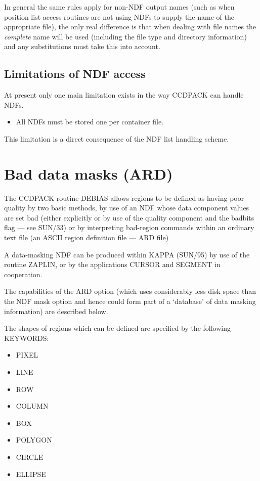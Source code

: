 In general the same rules apply for non-NDF output names (such as when
position list access routines are not using NDFs to supply the name of
the appropriate file), the only real difference is that when dealing
with file names the {\em complete} name will be used (including the file
type and directory information) and any substitutions must take this
into account.

\subsection{Limitations of NDF access}
At present only one main limitation exists in the way CCDPACK can handle
NDFs.

\begin{itemize}
\item All NDFs must be stored one per container file.
\end{itemize}

This limitation is a direct consequence of the NDF list handling scheme.

\section{Bad data masks (ARD)}
\label{datamasks}
The CCDPACK routine DEBIAS allows regions to be defined as having poor
quality by two basic methods, by use of an NDF whose data component
values are set bad (either explicitly or by use of the quality component
and the badbits flag --- see SUN/33) or by interpreting bad-region
commands within an ordinary text file (an ASCII region definition file
--- ARD file)

A data-masking NDF can be produced within KAPPA (SUN/95) by use of the
routine ZAPLIN, or by the applications CURSOR and SEGMENT in
cooperation.

The capabilities of the ARD option (which uses considerably less disk
space than the NDF mask option and hence could form part of a `database'
of data masking information) are described below.

The shapes of regions which can be defined are specified by the
following KEYWORDS:
\begin{itemize}
\item PIXEL
\item LINE
\item ROW
\item COLUMN
\item BOX
\item POLYGON
\item CIRCLE
\item ELLIPSE
\end{itemize}

